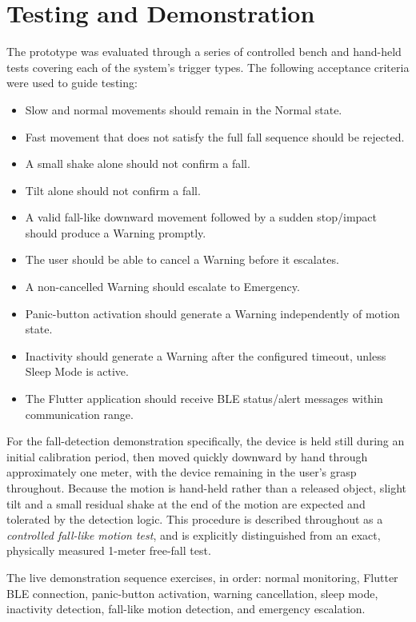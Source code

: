 \documentclass[lettersize,journal]{IEEEtran}
\begin{document}
\section{Testing and Demonstration}
The prototype was evaluated through a series of controlled bench and hand-held tests covering each of the system's trigger types. The following acceptance criteria were used to guide testing:
\begin{itemize}
\item Slow and normal movements should remain in the Normal state.
\item Fast movement that does not satisfy the full fall sequence should be rejected.
\item A small shake alone should not confirm a fall.
\item Tilt alone should not confirm a fall.
\item A valid fall-like downward movement followed by a sudden stop/impact should produce a Warning promptly.
\item The user should be able to cancel a Warning before it escalates.
\item A non-cancelled Warning should escalate to Emergency.
\item Panic-button activation should generate a Warning independently of motion state.
\item Inactivity should generate a Warning after the configured timeout, unless Sleep Mode is active.
\item The Flutter application should receive BLE status/alert messages within communication range.
\end{itemize}

For the fall-detection demonstration specifically, the device is held still during an initial calibration period, then moved quickly downward by hand through approximately one meter, with the device remaining in the user's grasp throughout. Because the motion is hand-held rather than a released object, slight tilt and a small residual shake at the end of the motion are expected and tolerated by the detection logic. This procedure is described throughout as a \emph{controlled fall-like motion test}, and is explicitly distinguished from an exact, physically measured 1-meter free-fall test.

The live demonstration sequence exercises, in order: normal monitoring, Flutter BLE connection, panic-button activation, warning cancellation, sleep mode, inactivity detection, fall-like motion detection, and emergency escalation.
\end{document}

